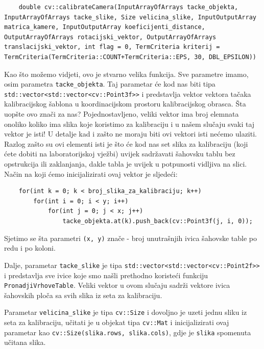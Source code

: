 \documentclass[a4paper, 12pt]{article}
\begin{document}
\begin{lstlisting}
    double cv::calibrateCamera(InputArrayOfArrays tacke_objekta, InputArrayOfArrays tacke_slike, Size velicina_slike, InputOutputArray matrica_kamere, InputOutputArray koeficijenti_distance, OutputArrayOfArrays rotacijski_vektor, OutputArrayOfArrays translacijski_vektor, int flag = 0, TermCriteria kriterij = TermCriteria(TermCriteria::COUNT+TermCriteria::EPS, 30, DBL_EPSILON))
\end{lstlisting}

Kao što možemo vidjeti, ovo je stvarno velika funkcija. Sve parametre imamo, osim parametra \lstinline{tacke_objekta}. Taj parametar će kod nas biti tipa \lstinline{std::vector<std::vector<cv::Point3f>>} i predstavlja vektor vektora tačaka kalibracijskog šablona u koordinacijskom prostoru kalibracijskog obrasca. Šta uopšte ovo znači za nas? Pojednostavljeno, veliki vektor ima broj elemnata onoliko koliko ima slika koje koristimo za kalibraciju i u našem slučaju svaki taj vektor je isti! U detalje kad i zašto ne moraju biti ovi vektori isti nećemo ulaziti. Razlog zašto su ovi elementi isti je što će kod nas set slika za kalibraciju (koji ćete dobiti na laboratorijskoj vježbi) uvijek sadržavati šahovsku tablu bez opstrukcija ili zaklanjanja, dakle tabla je uvijek u potpunosti vidljiva na slici. Način na koji ćemo inicijalizirati ovaj vektor je sljedeći:

\begin{lstlisting}
    for(int k = 0; k < broj_slika_za_kalibraciju; k++)
        for(int i = 0; i < y; i++)
            for(int j = 0; j < x; j++)
                tacke_objekta.at(k).push_back(cv::Point3f(j, i, 0));
\end{lstlisting}

Sjetimo se šta parametri \lstinline{(x, y)} znače - broj unutrašnjih ivica šahovske table po redu i po koloni.

Dalje, parametar \lstinline{tacke_slike} je tipa \lstinline{std::vector<std::vector<cv::Point2f>>} i predstavlja sve ivice koje smo našli prethodno koristeći funkciju \lstinline{PronadjiVrhoveTable}. Veliki vektor u ovom slučaju sadrži vektore ivica šahovskih ploča sa svih slika iz seta za kalibraciju.

Parametar \lstinline{velicina_slike} je tipa \lstinline{cv::Size} i dovoljno je uzeti jednu sliku iz seta za kalibraciju, učitati je u objekat tipa \lstinline{cv::Mat} i inicijalizirati ovaj parametar kao \lstinline{cv::Size(slika.rows, slika.cols)}, gdje je \lstinline{slika} spomenuta učitana slika.
\end{document}
